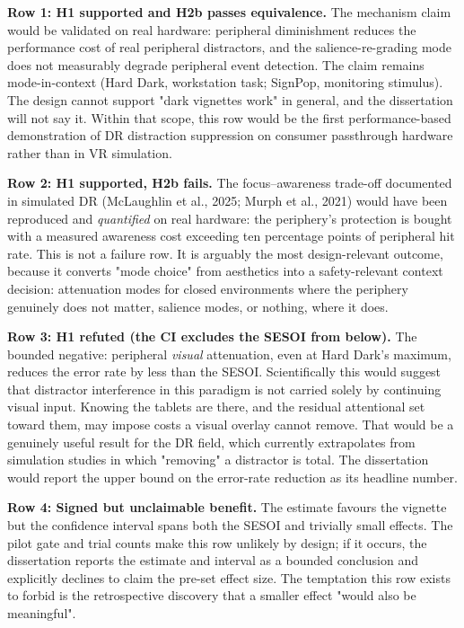 \textbf{Row 1: H1 supported and H2b passes equivalence.} The mechanism claim would be validated on real
hardware: peripheral diminishment reduces the performance cost of real peripheral distractors, and
the salience-re-grading mode does not measurably degrade peripheral event detection. The claim
remains mode-in-context (Hard Dark, workstation task; SignPop, monitoring stimulus). The design
cannot support "dark vignettes work" in general, and the dissertation will not say it. Within that
scope, this row would be the first performance-based demonstration of DR distraction suppression on
consumer passthrough hardware rather than in VR simulation.

\textbf{Row 2: H1 supported, H2b fails.} The focus–awareness trade-off documented in simulated DR
(McLaughlin et al., 2025; Murph et al., 2021) would have been reproduced and \textit{quantified}
on real hardware: the periphery's protection is bought with a measured awareness cost exceeding ten
percentage points of peripheral hit rate. This is not a failure row. It is arguably the most
design-relevant outcome, because it converts "mode choice" from aesthetics into a safety-relevant
context decision: attenuation modes for closed environments where the periphery genuinely does not
matter, salience modes, or nothing, where it does.

\textbf{Row 3: H1 refuted (the CI excludes the SESOI from below).} The bounded negative: peripheral
\textit{visual} attenuation, even at Hard Dark's maximum, reduces the error rate by less than the SESOI.
Scientifically this would suggest that distractor interference in this paradigm is not carried
solely by continuing visual input. Knowing the tablets are there, and the residual attentional
set toward them, may impose costs a visual overlay cannot remove. That would be a genuinely useful
result for the DR field, which currently extrapolates from simulation studies in which "removing"
a distractor is total. The dissertation would report the upper bound on the error-rate reduction as its
headline number.

\textbf{Row 4: Signed but unclaimable benefit.} The estimate favours the vignette but the confidence
interval spans both the SESOI and trivially small effects. The pilot gate and trial counts make
this row unlikely by design; if it occurs, the dissertation reports the estimate and interval as a
bounded conclusion and explicitly declines to claim the pre-set effect size. The temptation this
row exists to forbid is the retrospective discovery that a smaller effect "would also be
meaningful".

